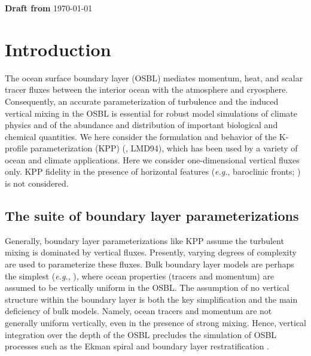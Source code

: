 \documentclass[preprint,12pt,authoryear]{agujournal}
\begin{document}
\begin{center} {\bf Draft from} \today  \end{center}


\section{Introduction}
\label{Intro_Mixing_background}

The ocean surface boundary layer (OSBL) mediates momentum, heat, and scalar tracer fluxes between the interior ocean with the atmosphere and cryosphere. Consequently, an accurate parameterization of turbulence and the induced vertical mixing in the OSBL is essential for robust model simulations of climate physics and of the abundance and distribution of important biological and chemical quantities.  We here consider the formulation and behavior of the K-profile parameterization (KPP) (\citealp{Large1994}, LMD94), which has been used by a variety of ocean and climate applications.  Here we consider one-dimensional vertical fluxes only.  KPP fidelity in the presence of horizontal features (\textit{e.g.}, baroclinic fronts; \citealp{bachman2017parameterization}) is not considered.

\subsection{The suite of boundary layer parameterizations}

Generally, boundary layer parameterizations like KPP assume the turbulent mixing is dominated by vertical fluxes. Presently, varying degrees of complexity are used to parameterize these fluxes.  Bulk boundary layer models are perhaps the simplest (\textit{e.g.}, \citealp{kraus1967one,Niller1977one,Price1986,gaspar1988modeling}), where ocean properties (tracers and momentum) are assumed to be vertically uniform in the OSBL.  The assumption of no vertical structure within the boundary layer is both the key simplification and the main deficiency of bulk models.  Namely, ocean tracers and momentum are not generally uniform vertically, even in the presence of strong mixing.  Hence, vertical integration over the depth of the OSBL precludes the simulation of OSBL processes such as the Ekman spiral and boundary layer restratification \citep[but see][for a proposed method to remedy these deficiencies]{Hallberg_mixed}. 
\end{document}
